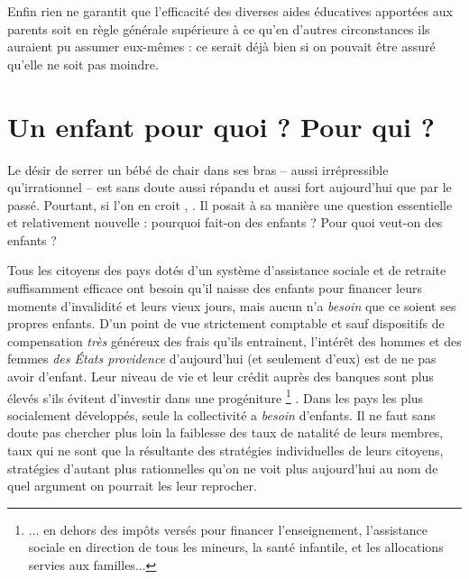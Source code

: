Enfin rien ne garantit que l'efficacité des diverses aides éducatives apportées aux parents soit en règle générale supérieure à ce qu'en d'autres circonstances ils auraient pu assumer eux-mêmes : ce serait déjà bien si on pouvait être assuré qu'elle ne soit pas moindre. 

 \chapter{Un enfant pour quoi ? Pour qui ?}



 

Le désir de serrer un bébé de chair dans ses bras -- aussi irrépressible qu'irrationnel -- est sans doute aussi répandu et aussi fort aujourd'hui que par le passé. Pourtant, si l'on en croit , . Il posait à sa manière une question essentielle et relativement nouvelle : pourquoi fait-on des enfants ? Pour quoi veut-on des enfants ?


 
 Tous les citoyens des pays dotés d'un système d'assistance sociale et de retraite suffisamment efficace ont besoin qu'il naisse des enfants pour financer leurs moments d'invalidité et leurs vieux jours, mais aucun n'a \emph{besoin} que ce soient ses propres enfants. D'un point de vue strictement comptable et sauf dispositifs de compensation \emph{très}  généreux des frais qu'ils entrainent, l'intérêt des hommes et des femmes \emph{des États providence} d'aujourd'hui (et seulement d'eux) est de ne pas avoir d'enfant. Leur niveau de vie et leur crédit auprès des banques sont plus élevés s'ils évitent d'investir dans une progéniture%
\footnote{... en dehors des impôts versés pour financer l'enseignement, l'assistance sociale en direction de tous les mineurs, la santé infantile, et les allocations servies aux familles...}%
. Dans les pays les plus socialement développés, seule la collectivité a \emph{besoin} d'enfants. Il ne faut sans doute pas chercher plus loin la faiblesse des taux de natalité de leurs membres, taux qui ne sont que la résultante des stratégies individuelles de leurs citoyens, stratégies d'autant plus rationnelles qu'on ne voit plus aujourd'hui au nom de quel argument on pourrait les leur reprocher. 
 
